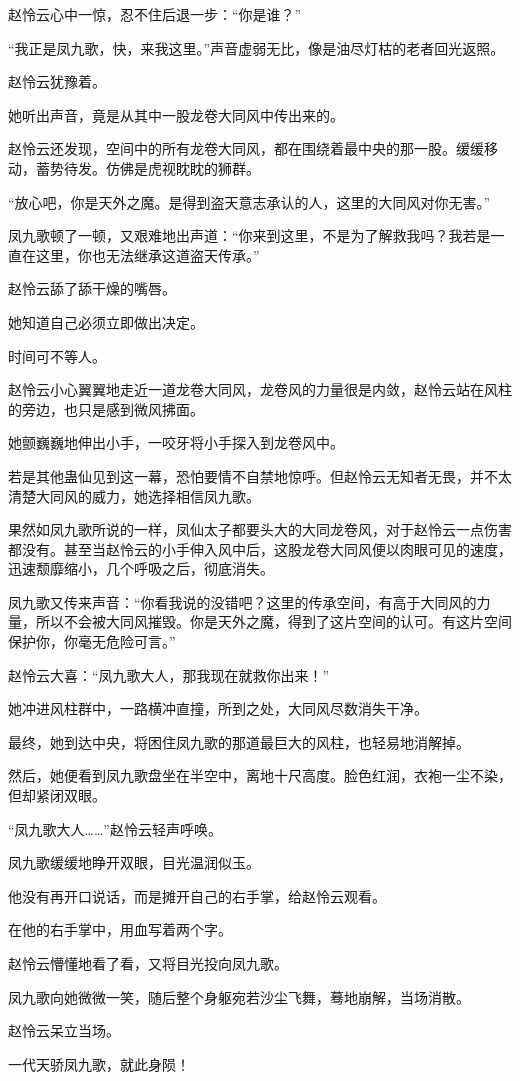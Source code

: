 \begin{this_body}
赵怜云心中一惊，忍不住后退一步：“你是谁？”

“我正是凤九歌，快，来我这里。”声音虚弱无比，像是油尽灯枯的老者回光返照。

赵怜云犹豫着。

她听出声音，竟是从其中一股龙卷大同风中传出来的。

赵怜云还发现，空间中的所有龙卷大同风，都在围绕着最中央的那一股。缓缓移动，蓄势待发。仿佛是虎视眈眈的狮群。

“放心吧，你是天外之魔。是得到盗天意志承认的人，这里的大同风对你无害。”

凤九歌顿了一顿，又艰难地出声道：“你来到这里，不是为了解救我吗？我若是一直在这里，你也无法继承这道盗天传承。”

赵怜云舔了舔干燥的嘴唇。

她知道自己必须立即做出决定。

时间可不等人。

赵怜云小心翼翼地走近一道龙卷大同风，龙卷风的力量很是内敛，赵怜云站在风柱的旁边，也只是感到微风拂面。

她颤巍巍地伸出小手，一咬牙将小手探入到龙卷风中。

若是其他蛊仙见到这一幕，恐怕要情不自禁地惊呼。但赵怜云无知者无畏，并不太清楚大同风的威力，她选择相信凤九歌。

果然如凤九歌所说的一样，凤仙太子都要头大的大同龙卷风，对于赵怜云一点伤害都没有。甚至当赵怜云的小手伸入风中后，这股龙卷大同风便以肉眼可见的速度，迅速颓靡缩小，几个呼吸之后，彻底消失。

凤九歌又传来声音：“你看我说的没错吧？这里的传承空间，有高于大同风的力量，所以不会被大同风摧毁。你是天外之魔，得到了这片空间的认可。有这片空间保护你，你毫无危险可言。”

赵怜云大喜：“凤九歌大人，那我现在就救你出来！”

她冲进风柱群中，一路横冲直撞，所到之处，大同风尽数消失干净。

最终，她到达中央，将困住凤九歌的那道最巨大的风柱，也轻易地消解掉。

然后，她便看到凤九歌盘坐在半空中，离地十尺高度。脸色红润，衣袍一尘不染，但却紧闭双眼。

“凤九歌大人……”赵怜云轻声呼唤。

凤九歌缓缓地睁开双眼，目光温润似玉。

他没有再开口说话，而是摊开自己的右手掌，给赵怜云观看。

在他的右手掌中，用血写着两个字。

赵怜云懵懂地看了看，又将目光投向凤九歌。

凤九歌向她微微一笑，随后整个身躯宛若沙尘飞舞，蓦地崩解，当场消散。

赵怜云呆立当场。

一代天骄凤九歌，就此身陨！

\end{this_body}

